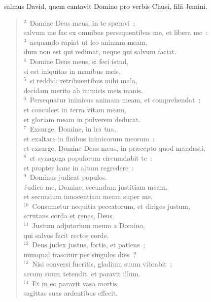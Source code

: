 \bchapter
{}salmus David, quem cantavit Domino pro verbis Chusi, filii Jemini.
\begin{flushleft}\begin{verse}\vspace{6pt}${}^{2}$~Domine Deus meus, in te speravi~;\\ salvum me fac ex omnibus persequentibus me, et libera me~:\\
${}^{3}$~nequando rapiat ut leo animam meam,\\ dum non est qui redimat, neque qui salvum faciat.\\
${}^{4}$~Domine Deus meus, si feci istud,\\ si est iniquitas in manibus meis,\\
${}^{5}$~si reddidi retribuentibus mihi mala,\\ decidam merito ab inimicis meis inanis.\\
${}^{6}$~Persequatur inimicus animam meam, et comprehendat~;\\ et conculcet in terra vitam meam,\\ et gloriam meam in pulverem deducat.\\
${}^{7}$~Exsurge, Domine, in ira tua,\\ et exaltare in finibus inimicorum meorum~:\\ et exsurge, Domine Deus meus, in pr\ae cepto quod mandasti,\\
${}^{8}$~et synagoga populorum circumdabit te~:\\ et propter hanc in altum regredere~:\\
${}^{9}$~Dominus judicat populos.\\ Judica me, Domine, secundum justitiam meam,\\ et secundum innocentiam meam super me.\\
${}^{10}$~Consumetur nequitia peccatorum, et diriges justum,\\ scrutans corda et renes, Deus.\\
${}^{11}$~Justum adjutorium meum a Domino,\\ qui salvos facit rectos corde.\\
${}^{12}$~Deus judex justus, fortis, et patiens~;\\ numquid irascitur per singulos dies~?\\
${}^{13}$~Nisi conversi fueritis, gladium suum vibrabit~;\\ arcum suum tetendit, et paravit illum.\\
${}^{14}$~Et in eo paravit vasa mortis,\\ sagittas suas ardentibus effecit.\\

\end{verse}
\end{flushleft}
